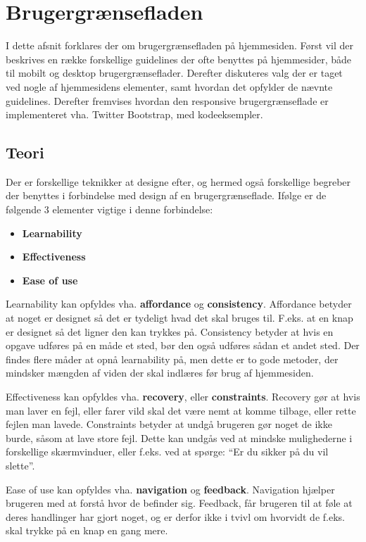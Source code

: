 \section{Brugergrænsefladen} \label{brugergraenseflade}
I dette afsnit forklares der om brugergrænsefladen på hjemmesiden.
Først vil der beskrives en række forskellige guidelines der ofte benyttes på hjemmesider, både til mobilt og desktop brugergrænseflader.
Derefter diskuteres valg der er taget ved nogle af hjemmesidens elementer, samt hvordan det opfylder de nævnte guidelines.
Derefter fremvises hvordan den responsive brugergrænseflade er implementeret vha. Twitter Bootstrap, med kodeeksempler. 

\subsection{Teori}

Der er forskellige teknikker at designe efter, og hermed også forskellige begreber der benyttes i forbindelse med design af en brugergrænseflade.
Ifølge \citep{DIS2014} er de følgende 3 elementer vigtige i denne forbindelse:
\begin{itemize}
	\item \textbf{Learnability}
	\item \textbf{Effectiveness}
	\item \textbf{Ease of use}
\end{itemize}

Learnability kan opfyldes vha. \textbf{affordance} og \textbf{consistency}.
Affordance betyder at noget er designet så det er tydeligt hvad det skal bruges til.
F.eks. at en knap er designet så det ligner den kan trykkes på. 
Consistency betyder at hvis en opgave udføres på en måde et sted, bør den også udføres sådan et andet sted.
Der findes flere måder at opnå learnability på, men dette er to gode metoder, der mindsker mængden af viden der skal indlæres før brug af hjemmesiden.

Effectiveness kan opfyldes vha. \textbf{recovery}, eller \textbf{constraints}.
Recovery gør at hvis man laver en fejl, eller farer vild skal det være nemt at komme tilbage, eller rette fejlen man lavede.
Constraints betyder at undgå brugeren gør noget de ikke burde, såsom at lave store fejl. 
Dette kan undgås ved at mindske mulighederne i forskellige skærmvinduer, eller f.eks. ved at spørge: ``Er du sikker på du vil slette''.

Ease of use kan opfyldes vha. \textbf{navigation} og \textbf{feedback}.
Navigation hjælper brugeren med at forstå hvor de befinder sig.
Feedback, får brugeren til at føle at deres handlinger har gjort noget, og er derfor ikke i tvivl om hvorvidt de f.eks. skal trykke på en knap en gang mere.

